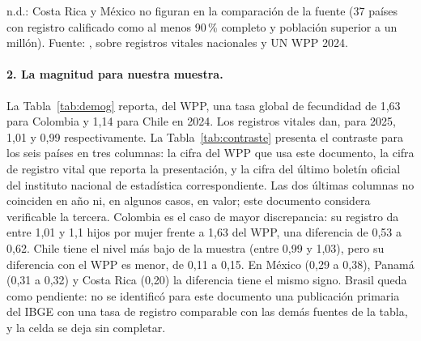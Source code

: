 \documentclass[12pt, letterpaper]{article}
\begin{document}
\begin{table}[htbp]
  \centering
  \caption{Nacimientos de 2024: registro vital frente a la proyección del WPP 2024
  publicada en julio de 2024, cuatro países de la muestra.}
  \label{tab:nacimientos}
  \small
  

  \vspace{2pt}
  \footnotesize
  n.d.: Costa Rica y México no figuran en la comparación de la fuente (37 países
  con registro calificado como al menos 90\,\% completo y población superior a un
  millón). Fuente: \citet{fv2026}, sobre registros vitales nacionales y UN WPP
  2024.
\end{table}

\paragraph{2. La magnitud para nuestra muestra.} La Tabla~\ref{tab:demog} reporta,
del WPP, una tasa global de fecundidad de 1,63 para Colombia y 1,14 para Chile en
2024. Los registros vitales dan, para 2025, 1,01 y 0,99 respectivamente. La
Tabla~\ref{tab:contraste} presenta el contraste para los seis países en tres
columnas: la cifra del WPP que usa este documento, la cifra de registro vital que
reporta la presentación, y la cifra del último boletín oficial del instituto
nacional de estadística correspondiente. Las dos últimas columnas no coinciden en
año ni, en algunos casos, en valor; este documento considera verificable la
tercera. Colombia es el caso de
mayor discrepancia: su registro da entre 1,01 y 1,1 hijos por mujer frente a 1,63
del WPP, una diferencia de 0,53 a 0,62. Chile tiene el nivel más bajo de la
muestra (entre 0,99 y 1,03), pero su diferencia con el WPP es menor, de 0,11 a
0,15. En México (0,29 a 0,38), Panamá (0,31 a 0,32) y Costa Rica (0,20) la
diferencia tiene el mismo signo. Brasil queda como pendiente: no se identificó
para este documento una publicación primaria del IBGE con una tasa de registro
comparable con las demás fuentes de la tabla, y la celda se deja sin completar.
\end{document}
